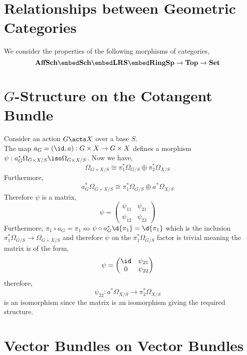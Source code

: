 \documentclass[12pt]{article}
\begin{document}
\section{Relationships between Geometric Categories}

\begin{rmk}
We consider the properties of the following morphisms of categories,
\[ \mathbf{AffSch} \embed \mathbf{Sch} \embed \mathbf{LRS} \embed \mathbf{RingSp} \to \mathbf{Top} \to \mathbf{Set} \]
\end{rmk}

\section{$G$-Structure on the Cotangent Bundle}

Consider an action $G \acts X$ over a base $S$.
\bigskip\\
The map $a_G = (\id, a) : G \times X \to G \times X$ defines a morphism $\psi : a_G^* \Omega_{G \times X/S} \iso \Omega_{G \times X/S}$. Now we have,
\[ \Omega_{G \times X /S} \cong \pi_1^* \Omega_{G/S} \oplus \pi_2^* \Omega_{X/S} \]
Furthermore,
\[ a_G^* \Omega_{G \times X / S} \cong \pi_1^* \Omega_{G/S} \oplus a^* \Omega_{X/S} \]
Therefore $\psi$ is a matrix,
\[ \psi = 
\begin{pmatrix}
\psi_{11} & \psi_{21}
\\
\psi_{12} & \psi_{22} 
\end{pmatrix} \]
Furthermore, $\pi_1 \circ a_G = \pi_1$ so $\psi \circ a_G^* \d{\pi_1} = \d{\pi_1}$ which is the inclusion $\pi_1^* \Omega_{G/S} \to \Omega_{G \times X / S}$ and therefore $\psi$ on the $\pi_1^* \Omega_{G/S}$ factor is trivial meaning the matrix is of the form,
\[ \psi = 
\begin{pmatrix}
\id & \psi_{21}
\\
0 & \psi_{22}
\end{pmatrix} \]
therefore,
\[ \psi_{22} : a^* \Omega_{X/S} \to \pi_2^* \Omega_{X/S} \]
is an isomorphism since the matrix is an isomorphism giving the required structure.

\section{Vector Bundles on Vector Bundles}
\end{document}
